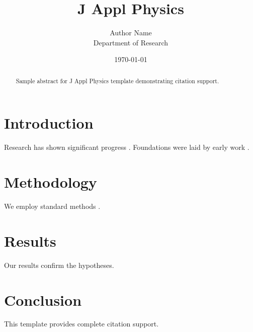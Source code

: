﻿\documentclass{elsarticle}
\title{J Appl Physics}
\author{Author Name \\ \small Department of Research}
\date{\today}
\begin{document}
\maketitle

\begin{abstract}
Sample abstract for J Appl Physics template demonstrating citation support.
\end{abstract}

\section{Introduction}
Research has shown significant progress \citep{einstein1905}. Foundations were laid by early work \citep{turing1950}.

\section{Methodology}
We employ standard methods \citep{knuth1984}.

\section{Results}
Our results confirm the hypotheses.

\section{Conclusion}
This template provides complete citation support.



\end{document}
